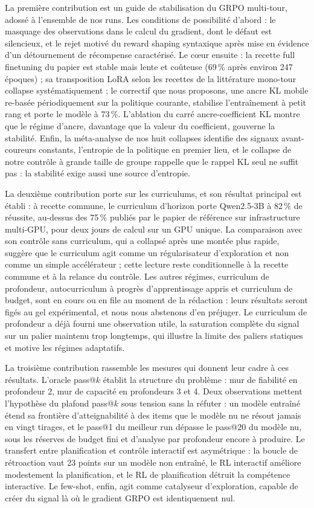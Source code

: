 \documentclass[11pt,a4paper]{article}
\begin{document}
La première contribution est un guide de stabilisation du GRPO multi-tour, adossé à l'ensemble de nos runs. Les conditions de possibilité d'abord : le masquage des observations dans le calcul du gradient, dont le défaut est silencieux, et le rejet motivé du reward shaping syntaxique après mise en évidence d'un détournement de récompense caractérisé. Le cœur ensuite : la recette full finetuning du papier est stable mais lente et coûteuse (69\,\% après environ 247 époques) ; sa transposition LoRA selon les recettes de la littérature mono-tour collapse systématiquement ; le correctif que nous proposons, une ancre KL mobile re-basée périodiquement sur la politique courante, stabilise l'entraînement à petit rang et porte le modèle à 73\,\%. L'ablation du carré ancre-coefficient KL montre que le régime d'ancre, davantage que la valeur du coefficient, gouverne la stabilité. Enfin, la méta-analyse de nos huit collapses identifie des signaux avant-coureurs constants, l'entropie de la politique en premier lieu, et le collapse de notre contrôle à grande taille de groupe rappelle que le rappel KL seul ne suffit pas : la stabilité exige aussi une source d'entropie.

La deuxième contribution porte sur les curriculums, et son résultat principal est établi : à recette commune, le curriculum d'horizon porte Qwen2.5-3B à 82\,\% de réussite, au-dessus des 75\,\% publiés par le papier de référence sur infrastructure multi-GPU, pour deux jours de calcul sur un GPU unique. La comparaison avec son contrôle sans curriculum, qui a collapsé après une montée plus rapide, suggère que le curriculum agit comme un régularisateur d'exploration et non comme un simple accélérateur ; cette lecture reste conditionnelle à la recette commune et à la relance du contrôle. Les autres régimes, curriculum de profondeur, autocurriculum à progrès d'apprentissage appris et curriculum de budget, sont en cours ou en file au moment de la rédaction : leurs résultats seront figés au gel expérimental, et nous nous abstenons d'en préjuger. Le curriculum de profondeur a déjà fourni une observation utile, la saturation complète du signal sur un palier maintenu trop longtemps, qui illustre la limite des paliers statiques et motive les régimes adaptatifs.

La troisième contribution rassemble les mesures qui donnent leur cadre à ces résultats. L'oracle pass@$k$ établit la structure du problème : mur de fiabilité en profondeur 2, mur de capacité en profondeurs 3 et 4. Deux observations mettent l'hypothèse du plafond pass@$k$ sous tension sans la réfuter : un modèle entraîné étend sa frontière d'atteignabilité à des items que le modèle nu ne résout jamais en vingt tirages, et le pass@1 du meilleur run dépasse le pass@20 du modèle nu, sous les réserves de budget fini et d'analyse par profondeur encore à produire. Le transfert entre planification et contrôle interactif est asymétrique : la boucle de rétroaction vaut 23 points sur un modèle non entraîné, le RL interactif améliore modestement la planification, et le RL de planification détruit la compétence interactive. Le few-shot, enfin, agit comme catalyseur d'exploration, capable de créer du signal là où le gradient GRPO est identiquement nul.
\end{document}
